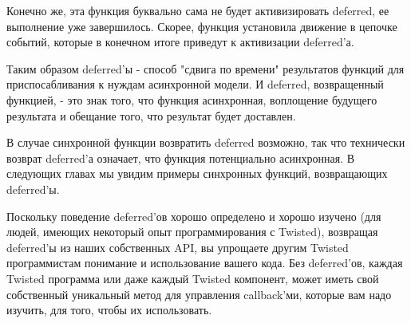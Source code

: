 Конечно же, эта функция буквально сама не будет активизировать 
deferred, ее выполнение уже завершилось. Скорее, функция 
установила движение в цепочке событий, которые в конечном итоге 
приведут к активизации deferred'а.   


Таким образом deferred'ы - способ "сдвига по времени" 
результатов функций для приспосабливания к нуждам 
асинхронной модели. И deferred, возвращенный функцией, - это 
знак того, что функция асинхронная, воплощение будущего 
результата и обещание того, что результат будет доставлен.


В случае синхронной функции возвратить deferred возможно, 
так что технически возврат deferred'а означает, что 
функция потенциально асинхронная. В следующих главах мы 
увидим примеры синхронных функций, возвращающих deferred'ы.


Поскольку поведение deferred'ов хорошо определено и 
хорошо изучено (для людей, имеющих некоторый опыт программирования 
с Twisted), возвращая deferred'ы из наших собственных API, 
вы упрощаете другим Twisted программистам понимание и использование 
вашего кода. Без deferred'ов, каждая Twisted программа или даже 
каждый Twisted компонент, может иметь свой собственный уникальный 
метод для управления callback'ми, которые вам надо изучить, для 
того, чтобы их использовать. 



